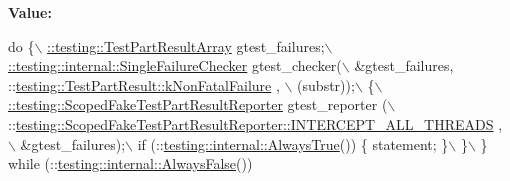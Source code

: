 {\bfseries Value\+:}
\begin{DoxyCode}
\textcolor{keywordflow}{do} \{\(\backslash\)
    \hyperlink{classtesting_1_1_test_part_result_array}{::testing::TestPartResultArray} gtest\_failures;\(\backslash\)
    \hyperlink{classtesting_1_1internal_1_1_single_failure_checker}{::testing::internal::SingleFailureChecker} gtest\_checker(\(\backslash\)
        &gtest\_failures, ::\hyperlink{classtesting_1_1_test_part_result_a65ae656b33fdfdfffaf34858778a52d5a00a755614f8ec3f78b2e951f8c91cd92}{testing::TestPartResult::kNonFatalFailure}
      , \(\backslash\)
        (substr));\(\backslash\)
    \{\(\backslash\)
      \hyperlink{classtesting_1_1_scoped_fake_test_part_result_reporter}{::testing::ScopedFakeTestPartResultReporter} gtest\_reporter
      (\(\backslash\)
          ::\hyperlink{classtesting_1_1_scoped_fake_test_part_result_reporter_a82f6209b3cf5c4b15ec8bd8041dbc2d5a187f4164aad7fbb9414b263c68a693cd}{testing::ScopedFakeTestPartResultReporter::INTERCEPT\_ALL\_THREADS}
      , \(\backslash\)
          &gtest\_failures);\(\backslash\)
      if (::\hyperlink{namespacetesting_1_1internal_a922c9da63cd4bf94fc473b9ecac76414}{testing::internal::AlwaysTrue}()) \{ statement; \}\(\backslash\)
    \}\(\backslash\)
  \} \textcolor{keywordflow}{while} (::\hyperlink{namespacetesting_1_1internal_a4b24c851ab13569b1b15b3d259b60d2e}{testing::internal::AlwaysFalse}())
\end{DoxyCode}
